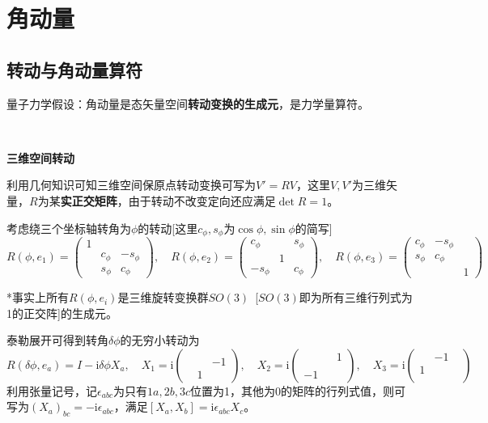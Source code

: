 \documentclass[a4paper,UTF8,fontset=windows]{ctexart}
\newcommand*{\ir}{\mathrm{i}}
\begin{document}
\section{角动量}
\subsection{转动与角动量算符}
量子力学假设：角动量是态矢量空间\textbf{转动变换的生成元}，是力学量算符。

\

\textbf{三维空间转动}

利用几何知识可知三维空间保原点转动变换可写为$V'=RV$，这里$V,V'$为三维矢量，$R$为某\textbf{实正交矩阵}，由于转动不改变定向还应满足$\det R=1$。

考虑绕三个坐标轴转角为$\phi$的转动[这里$c_\phi,s_\phi$为$\cos\phi,\sin\phi$的简写]
$$R(\phi,e_1)=\begin{pmatrix}1&& \\ &c_\phi&-s_\phi\\ &s_\phi&c_\phi\end{pmatrix},\quad R(\phi, e_2)=\begin{pmatrix}c_\phi&&s_\phi\\ &1&\\-s_\phi&&c_\phi\end{pmatrix},\quad R(\phi,e_3)=\begin{pmatrix}c_\phi&-s_\phi&\\s_\phi&c_\phi&\\ &&1\end{pmatrix}$$

*事实上所有$R(\phi,e_i)$是三维旋转变换群$SO(3)$\ [$SO(3)$即为所有三维行列式为1的正交阵]的生成元。

泰勒展开可得到转角$\delta\phi$的无穷小转动为
$$R(\delta\phi,e_a)=I-\ir\delta\phi X_a,\quad X_1=\ir\begin{pmatrix} &&\\ &&-1\\ &1&\end{pmatrix},\quad X_2=\ir\begin{pmatrix}&&1\\ &&\\-1&&\end{pmatrix},\quad X_3=\ir\begin{pmatrix}&-1&\\1&&\\ &&\end{pmatrix}$$
利用张量记号，记$\epsilon_{abc}$为只有$1a,2b,3c$位置为1，其他为0的矩阵的行列式值，则可写为$(X_a)_{bc}=-\ir\epsilon_{abc}$，满足$[X_a,X_b]=\ir\epsilon_{abc}X_c$。
\end{document}
